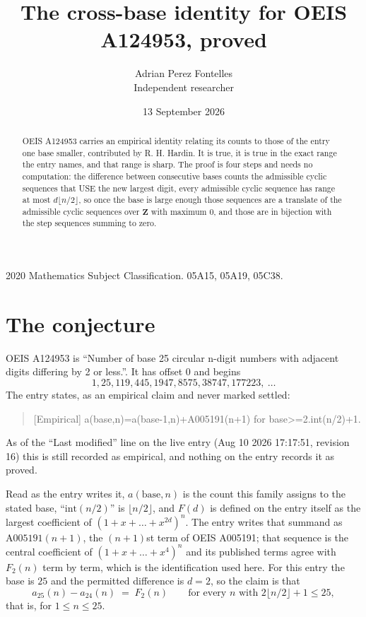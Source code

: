 \documentclass[11pt,a4paper]{article}
\title{The cross-base identity for OEIS A124953, proved}
\author{Adrian Perez Fontelles\\ \small Independent researcher}
\date{13 September 2026}
\theoremstyle{plain}
\theoremstyle{definition}
\begin{document}
\maketitle

\begin{abstract}
OEIS A124953 carries an empirical identity relating its counts to those of the entry one base
smaller, contributed by R. H. Hardin. It is true, it is true in the exact range the entry
names, and that range is sharp. The proof is four steps and needs no computation: the
difference between consecutive bases counts the admissible cyclic sequences that USE the new
largest digit, every admissible cyclic sequence has range at most $d\lfloor n/2\rfloor$, so
once the base is large enough those sequences are a translate of the admissible cyclic
sequences over $\mathbf{Z}$ with maximum $0$, and those are in bijection with the step
sequences summing to zero.
\end{abstract}

\noindent\small 2020 Mathematics Subject Classification. 05A15, 05A19, 05C38.\normalsize

\section{The conjecture}

OEIS A124953 is ``Number of base 25 circular n-digit numbers with adjacent digits differing by 2 or less.''. It has offset $0$ and begins
\[
1, 25, 119, 445, 1947, 8575, 38747, 177223,\ \dots
\]
The entry states, as an empirical claim and never marked settled:
\begin{quote}
[Empirical] a(base,n)=a(base-1,n)+A005191(n+1) for base>=2.int(n/2)+1.
\end{quote}
As of the ``Last modified'' line on the live entry (Aug 10 2026 17:17:51, revision 16)
this is still recorded as empirical, and nothing on the entry records it as proved.

Read as the entry writes it, $a(\mathrm{base},n)$ is the count this family assigns to the
stated base, ``$\mathrm{int}(n/2)$'' is $\lfloor n/2\rfloor$, and $F(d)$ is defined on the
entry itself as the largest coefficient of $(1+x+\dots+x^{2d})^{n}$. The entry writes that summand as $\mathrm{A005191}(n+1)$, the $(n+1)$st term of OEIS A005191; that sequence is the central coefficient of $(1+x+\dots+x^{4})^{n}$ and its published terms agree with $F_{2}(n)$ term by term, which is the identification used here. For this entry
the base is $25$ and the permitted difference is $d=2$, so the claim is that
\[
a_{25}(n)-a_{24}(n)\;=\;F_{2}(n)
\qquad\text{for every } n \text{ with } 2\lfloor n/2\rfloor+1\le25,
\]
that is, for $1\le n\le25$.
\end{document}
